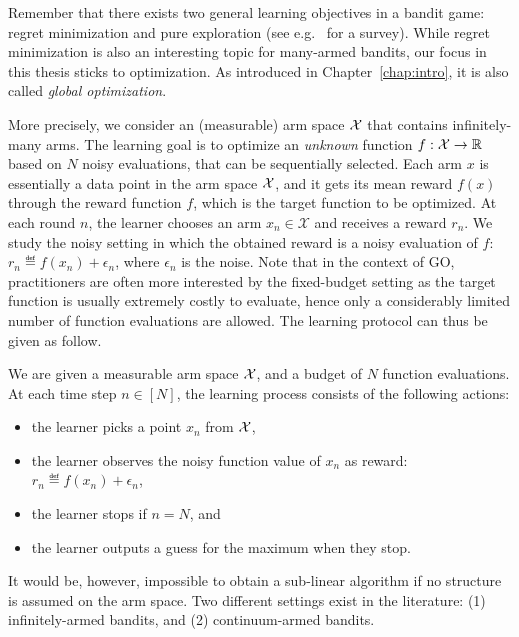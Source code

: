 Remember that there exists two general learning objectives in a bandit game: regret minimization and pure exploration (see e.g.~\citealt{kaufmann2017survey} for a survey). While regret minimization is also an interesting topic for many-armed bandits, our focus in this thesis sticks to optimization. As introduced in Chapter~\ref{chap:intro}, it is also called \emph{global optimization}.

More precisely, we consider an (measurable) arm space $\mathcal{X}$ that contains infinitely-many arms. The learning goal is to optimize an \emph{unknown} function $f: \mathcal{X} \rightarrow \mathbb{R}$ based on $N$ noisy evaluations, that can be sequentially selected. Each arm $x$ is essentially a data point in the arm space $\mathcal{X}$, and it gets its mean reward $f(x)$ through the reward function $f$, which is the target function to be optimized. At each round $n$, the learner chooses an arm $x_n \in \mathcal{X}$ and receives a reward $r_n$. We study the noisy setting in which the obtained reward is a noisy evaluation of $f$: $r_n \eqdef f(x_n) + \epsilon_n$, where $\epsilon_n$ is the noise. Note that in the context of GO, practitioners are often more interested by the fixed-budget setting as the target function is usually extremely costly to evaluate, hence only a considerably limited number of function evaluations are allowed. The learning protocol can thus be given as follow.

\begin{definition}\label{def:mab.go}
\begin{leftbar}[defnbar]
	We are given a measurable arm space $\mathcal{X}$, and a budget of $N$ function evaluations. At each time step $n\in[N]$, the learning process consists of the following actions:
\begin{itemize}
	\item the learner picks a point $x_n$ from $\mathcal{X}$,
	\item the learner observes the noisy function value of $x_n$ as reward: $r_n \eqdef f(x_n) + \epsilon_n$,
	\item the learner stops if $n=N$, and
	\item the learner outputs a guess for the maximum when they stop.
\end{itemize}
\end{leftbar}
\end{definition}

It would be, however, impossible to obtain a sub-linear algorithm if no structure is assumed on the arm space. Two different settings exist in the literature: (1) \gls{infinitely-armed bandits}, and (2) \gls{continuum-armed bandits}. 

